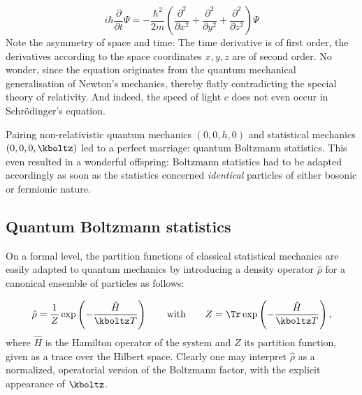 \documentclass{scrartcl}
\begin{document}
\begin{equation*}\label{eq:schroedinger}
  i\hbar\frac{\partial}{\partial t}\Psi=-\frac{\hbar^2}{2m}(\frac{\partial^2}{\partial x^2}+\frac{\partial^2}{\partial y^2}+\frac{\partial^2}{\partial z^2})\Psi
\end{equation*}
%
Note the asymmetry of space and time: The time derivative is of first order, the derivatives according to the space coordinates $x,y,z$ are of second order. No wonder, since the equation originates from the quantum mechanical generalisation of Newton's mechanics, thereby flatly contradicting the special theory of relativity. And indeed, the speed of light $c$ does not even occur in Schrödinger's equation.



\newpage {}
\label{sec:0011}

Pairing non-relativistic quantum mechanics $(0,0,h,0)$ and statistical mechanics $(0,0,0,\kboltz)$ led to a perfect marriage: quantum Boltzmann statistics. This even resulted in a wonderful offspring: Boltzmann statistics had to be adapted accordingly as soon as the statistics concerned \emph{identical} particles of either bosonic or fermionic nature.



\subsection*{Quantum Boltzmann statistics}

On a formal level, the partition functions of classical statistical mechanics are easily adapted to quantum mechanics by introducing a density operator $\hat\rho$ for a canonical ensemble of particles as follows:

\begin{equation*}
  \hat \rho=\frac{1}{Z} \exp\left(-\frac{\hat H}{\kboltz T}\right)
    \qquad \textrm{with} \qquad
    Z=\Tr \exp\left(-\frac{\hat H}{\kboltz T}\right),
\end{equation*}
%
where $\hat H$ is the Hamilton operator of the system and $Z$ its partition function, given as a trace over the Hilbert space. Clearly one may interpret $\hat\rho$ as a normalized, operatorial version of the Boltzmann factor, with the explicit appearance of $\kboltz$.
\end{document}
